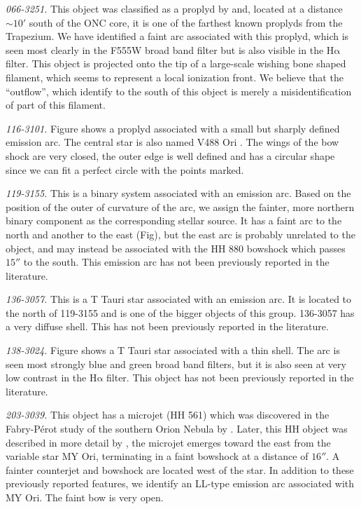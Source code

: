 \documentclass[apj, twocolumn]{aastex63}
\newcommand\ha{\ensuremath{\mathrm{H\alpha}}}
\begin{document}
\textit{066-3251.} This object was classified as a proplyd
by \citet{Ricci:2008a} and, located at a distance \(\sim 10'\)
south of the ONC core, it is one of the farthest known proplyds
from the Trapezium. We have identified a faint arc associated
with this proplyd, which is seen most clearly in the F555W broad
band filter but is also visible in the \ha{} filter. This object
is projected onto the tip of a large-scale wishing bone shaped
filament, which seems to represent a local ionization front.
We believe that the ``outflow'', which \citet{Ricci:2008a} identify
to the south of this object is merely a misidentification of
part of this filament.  

\textit{116-3101.} Figure shows a proplyd associated with a small
but sharply defined emission arc.  The central star is also
named V488 Ori \citep{Bally:2006a}. The wings of the bow shock
are very closed, the outer edge is well defined and has a circular
shape since we can fit a perfect circle with the points marked.  

\textit{119-3155.} This is a binary system associated with an
emission arc. Based on the position of the outer of curvature of
the arc, we assign the fainter, more northern binary component as
the corresponding stellar source. It has a faint arc to the north
and another to the east (Fig), but  the east arc is probably
unrelated to the object, and may instead be associated with the
HH 880 bowshock which passes \(15''\) to the south. This emission
arc has not been previously reported in the literature.     

\textit{136-3057.} This is a T Tauri star associated with an
emission arc. It is located to the north of 119-3155 and is
one of the bigger objects of this group. 136-3057 has a very
diffuse shell. This has not been previously reported in the
literature.

\textit{138-3024.} Figure shows a T Tauri star associated with a
thin shell. The arc is seen most strongly blue and green broad
band filters, but it is also seen at very low contrast in the \ha{}
filter. This object has not been previously reported in the
literature.

\textit{203-3039.} This object has a microjet (HH 561) which was
discovered in the Fabry-Pérot study of the southern Orion Nebula
by \citet{Bally:2001a}. Later, this HH object was described in
more detail by \citet{Bally:2006a}, the microjet emerges toward
the east from the variable star MY Ori, terminating in a faint
bowshock at a distance of \(16''\). A fainter counterjet and
bowshock are located west of the star. In addition to these
previously reported features, we identify an LL-type emission arc
associated with MY Ori. The faint bow is very open.
\end{document}
